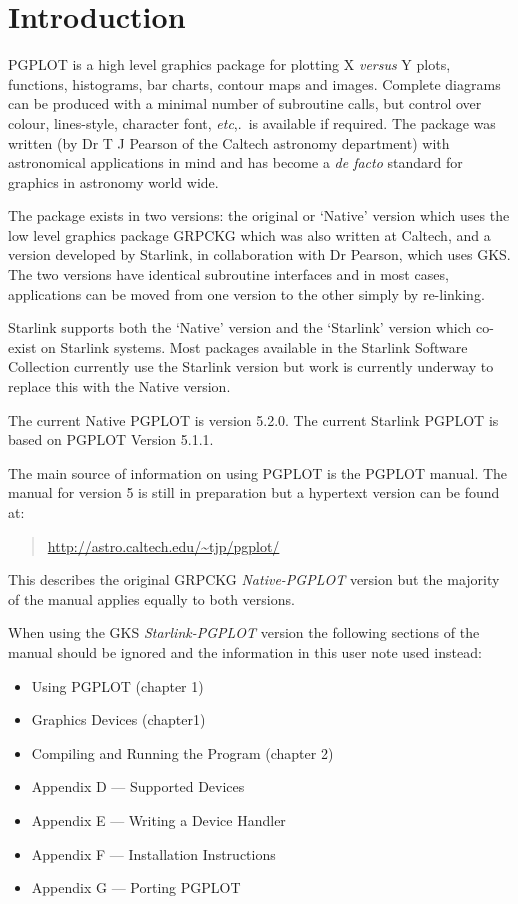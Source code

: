 \documentclass[twoside,11pt,nolof]{starlink}
\begin{document}
\scfrontmatter


\section{Introduction}
\label{introduction}

PGPLOT is a high level graphics package for plotting X \emph{versus} Y
plots, functions, histograms, bar charts, contour maps and images.
Complete diagrams can be produced with a minimal number of subroutine
calls, but control over colour, lines-style, character font,
\emph{etc},.\ is available if required.  The package was written (by Dr
T J Pearson of the Caltech astronomy department) with astronomical
applications in mind and has become a \textit{de facto} standard for
graphics in astronomy world wide.

The package exists in two versions: the original or `Native' version
which uses the low level graphics package GRPCKG which was also
written at Caltech, and a version developed by Starlink, in
collaboration with Dr Pearson, which uses GKS.  The two versions have
identical subroutine interfaces and in most cases, applications can be
moved from one version to the other simply by re-linking.

Starlink supports both the `Native' version and the `Starlink' version
which co-exist on Starlink systems.  Most packages available in the
Starlink Software Collection currently use the Starlink version but
work is currently underway to replace this with the Native version.

The current Native PGPLOT is version 5.2.0.
The current Starlink PGPLOT is based on PGPLOT Version 5.1.1.

The main source of information on using PGPLOT is the PGPLOT manual.
The manual for version 5 is still in preparation but a hypertext version
can be found at:
\begin{quote}
\url{http://astro.caltech.edu/\~tjp/pgplot/}
\end{quote}
This describes the original GRPCKG \emph{Native-PGPLOT} version but the
majority of the manual applies equally to both versions.

When using the GKS \emph{Starlink-PGPLOT} version the following
sections of the manual should be ignored and the information in this
user note used instead:

\begin{itemize}
\item Using PGPLOT (chapter 1)
\item Graphics Devices (chapter1)
\item Compiling and Running the Program (chapter 2)
\item Appendix D --- Supported Devices
\item Appendix E --- Writing a Device Handler
\item Appendix F --- Installation Instructions
\item Appendix G --- Porting PGPLOT
\end{itemize}
\end{document}
